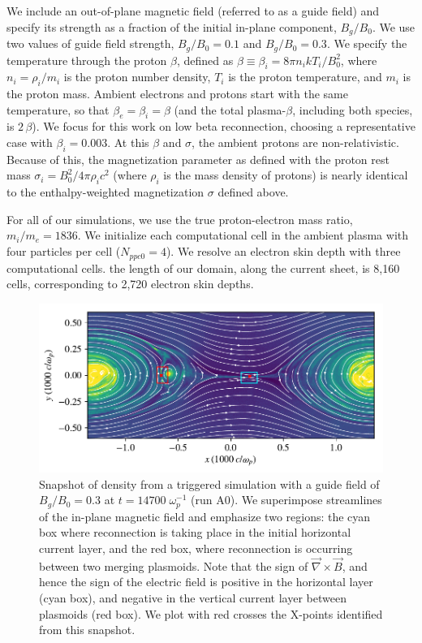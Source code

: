 We include an out-of-plane magnetic field (referred to as a guide field) and specify its strength as a fraction of the initial in-plane component, $B_{g}/B_{0}$.  We use two values of guide field strength, $B_{g}/B_{0}=0.1$ and $B_{g}/B_{0}=0.3$.  We specify the temperature through the proton $\beta$, defined as $\beta \equiv \beta_{i}=8 \pi n_{i} k T_{i}/B_{0}^{2}$, where $n_i=\rho_i/m_i$ is the proton number density, $T_i$ is the proton temperature, and $m_i$ is the proton mass. Ambient electrons and protons start with the same temperature, so that $\beta_e=\beta_i=\beta$ (and the total plasma-$\beta$, including both species, is $2\,\beta$).  We focus for this work on low beta reconnection, choosing a representative case with $\beta_{i}=0.003$.  At this $\beta$ and $\sigma$, the ambient protons are non-relativistic.  Because of this, the magnetization parameter as defined with the proton rest mass $\sigma_{i}=B_0^2/4\pi \rho_i c^2$ (where $\rho_i$ is the mass density of protons) is nearly identical to the enthalpy-weighted magnetization $\sigma$ defined above. 

For all of our simulations, we use the true proton-electron mass ratio, $m_{i}/m_{e}=1836$.  We initialize each computational cell in the ambient plasma with four particles per cell ($N_{ppc0}=4$).  We resolve an electron skin depth with three computational cells.   the length of our domain, along the current sheet, is 8,160 cells, corresponding to 2,720 electron skin depths.

\begin{figure}[t]
	\includegraphics[width=\linewidth]{blines_withx.pdf}
	\caption{Snapshot of density from a triggered simulation with a guide field of $B_{g}/B_{0}=0.3$ at $t=14700 \; \omega_{p}^{-1}$ (run A0).  We superimpose streamlines of the in-plane magnetic field and emphasize two regions: the cyan box where reconnection is taking place in the initial horizontal current layer, and the red box, where reconnection is occurring between two merging plasmoids.  Note that the sign of $\vec{\nabla}\times \vec{B}$, and hence the sign of the electric field is positive in the horizontal layer (cyan box), and negative in the vertical current layer between plasmoids (red box).  We plot with red crosses the X-points identified from this snapshot.
	}
	\label{blines}
\end{figure}

